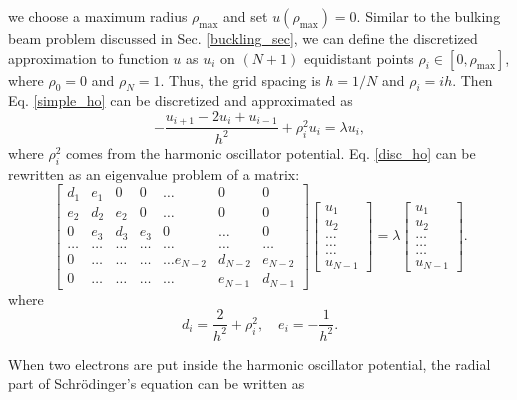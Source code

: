 \documentclass{article}
\begin{document}
we choose a maximum radius $\rho_\mathrm{max}$ and set $u(\rho_\mathrm{max})=0$. 
Similar to the bulking beam problem discussed in Sec. \ref{buckling_sec}, 
we can define the discretized approximation to function $u$ as $u_i$ 
on $(N+1)$ equidistant points $\rho_i \in [0,\rho_\mathrm{max}]$, 
where $\rho_0=0$ and $\rho_N=1$. Thus, the grid spacing is $h=1/N$ and $\rho_i=ih$. 
Then Eq. \ref{simple_ho} can be discretized and approximated as 
\begin{equation}\label{disc_ho}
-\frac{u_{i+1} -2u_i +u_{i-1} }{h^2}+\rho_i^2u_i  = \lambda u_i,
\end{equation}
where $\rho_i^2$ comes from the harmonic oscillator potential. 
Eq. \ref{disc_ho} can be rewritten as an eigenvalue problem of a matrix: 
\begin{equation}
    \begin{bmatrix}d_1 & e_1 & 0   & 0    & \dots  &0     & 0 \\
	e_2 & d_2 & e_2 & 0    & \dots  &0     &0 \\
	0   & e_3 & d_3 & e_3  &0       &\dots & 0\\
	\dots  & \dots & \dots & \dots  &\dots      &\dots & \dots\\
	0   & \dots & \dots & \dots  &\dots  e_{N-2}     &d_{N-2} & e_{N-2}\\
	0   & \dots & \dots & \dots  &\dots       &e_{N-1} & d_{N-1}
	\end{bmatrix}  \begin{bmatrix} u_{1} \\
	u_{2} \\
	\dots\\ \dots\\ \dots\\
	u_{N-1}
	\end{bmatrix}=\lambda \begin{bmatrix} u_{1} \\
	u_{2} \\
	\dots\\ \dots\\ \dots\\
	u_{N-1}
	\end{bmatrix}.  
\label{eq:sematrix}
\end{equation}
where
\begin{equation}
d_i=\frac{2}{h^2}+\rho_i^2, \quad
e_i=-\frac{1}{h^2}.
\end{equation}
\par
When two electrons are put inside the harmonic oscillator potential, the radial part of Schr\"{o}dinger's equation can be written as 
\end{document}
